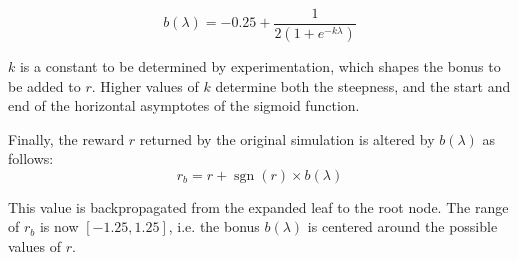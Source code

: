 \documentclass{ecai2014}
\newcommand{\sgn}{\mathop{\mathrm{sgn}}}
\begin{document}
\begin{equation}
b(\lambda)=-0.25+\frac{1}{2\left(1+e^{-k\lambda}\right)}
\label{eq:sigmoid}
\end{equation}

$k$ is a constant to be determined by experimentation, which shapes the bonus to be added to $r$. Higher values of $k$ determine both the steepness, and the start and end of the horizontal asymptotes of the sigmoid function.



Finally, the reward $r$ returned by the original simulation is altered by $b(\lambda)$ as follows:
\begin{equation}
r_b = r + \sgn(r) \times b(\lambda)
\end{equation}

This value is backpropagated from the expanded leaf to the root node. The range of $r_b$ is now $[-1.25, 1.25]$, i.e. the bonus $b(\lambda)$ is centered around the possible values of $r$.
\end{document}
